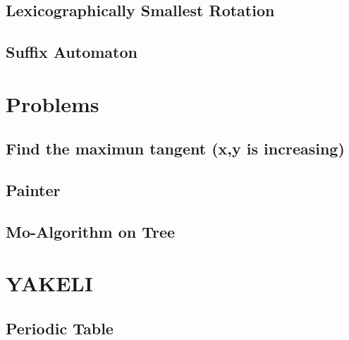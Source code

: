 \documentclass[10pt,twocolumn,oneside]{article}
\begin{document}
\subsection{Lexicographically Smallest Rotation}


\subsection{Suffix Automaton}


\section{Problems}
%

\subsection{Find the maximun tangent (x,y is increasing)}


%

%

\subsection{Painter}


\subsection{Mo-Algorithm on Tree}


\clearpage

\section{YAKELI}

\subsection{Periodic Table}


%
\end{document}
